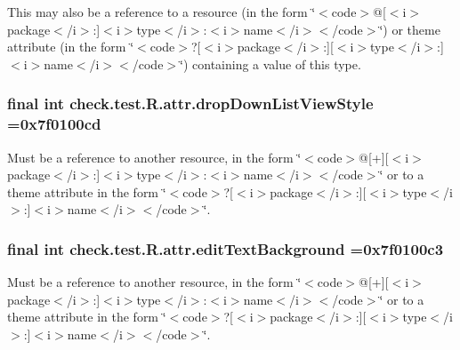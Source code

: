 This may also be a reference to a resource (in the form \char`\"{}$<$code$>$@\mbox{[}$<$i$>$package$<$/i$>$\+:\mbox{]}$<$i$>$type$<$/i$>$\+:$<$i$>$name$<$/i$>$$<$/code$>$\char`\"{}) or theme attribute (in the form \char`\"{}$<$code$>$?\mbox{[}$<$i$>$package$<$/i$>$\+:\mbox{]}\mbox{[}$<$i$>$type$<$/i$>$\+:\mbox{]}$<$i$>$name$<$/i$>$$<$/code$>$\char`\"{}) containing a value of this type. \hypertarget{classcheck_1_1test_1_1_r_1_1attr_a2ab3d3b572318de39593854b08d4e145}{}
\subsubsection[{drop\+Down\+List\+View\+Style}]{\setlength{\rightskip}{0pt plus 5cm}final int check.\+test.\+R.\+attr.\+drop\+Down\+List\+View\+Style =0x7f0100cd\hspace{0.3cm}{\ttfamily [static]}}\label{classcheck_1_1test_1_1_r_1_1attr_a2ab3d3b572318de39593854b08d4e145}
Must be a reference to another resource, in the form \char`\"{}$<$code$>$@\mbox{[}+\mbox{]}\mbox{[}$<$i$>$package$<$/i$>$\+:\mbox{]}$<$i$>$type$<$/i$>$\+:$<$i$>$name$<$/i$>$$<$/code$>$\char`\"{} or to a theme attribute in the form \char`\"{}$<$code$>$?\mbox{[}$<$i$>$package$<$/i$>$\+:\mbox{]}\mbox{[}$<$i$>$type$<$/i$>$\+:\mbox{]}$<$i$>$name$<$/i$>$$<$/code$>$\char`\"{}. \hypertarget{classcheck_1_1test_1_1_r_1_1attr_a730ff093ffe34aee1d53f2e640ede7ed}{}
\subsubsection[{edit\+Text\+Background}]{\setlength{\rightskip}{0pt plus 5cm}final int check.\+test.\+R.\+attr.\+edit\+Text\+Background =0x7f0100c3\hspace{0.3cm}{\ttfamily [static]}}\label{classcheck_1_1test_1_1_r_1_1attr_a730ff093ffe34aee1d53f2e640ede7ed}
Must be a reference to another resource, in the form \char`\"{}$<$code$>$@\mbox{[}+\mbox{]}\mbox{[}$<$i$>$package$<$/i$>$\+:\mbox{]}$<$i$>$type$<$/i$>$\+:$<$i$>$name$<$/i$>$$<$/code$>$\char`\"{} or to a theme attribute in the form \char`\"{}$<$code$>$?\mbox{[}$<$i$>$package$<$/i$>$\+:\mbox{]}\mbox{[}$<$i$>$type$<$/i$>$\+:\mbox{]}$<$i$>$name$<$/i$>$$<$/code$>$\char`\"{}. \hypertarget{classcheck_1_1test_1_1_r_1_1attr_aad21217d13320c22507aeaf702f94f11}{}
